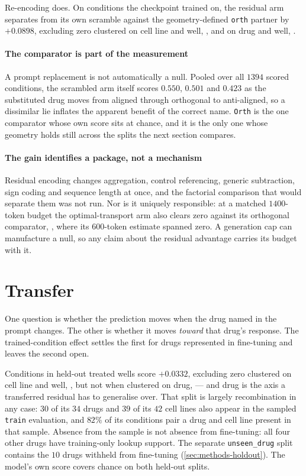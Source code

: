 Re-encoding does. On conditions the checkpoint trained on, the residual arm
separates from its own scramble against the geometry-defined \texttt{orth}
partner by $+0.0898$, excluding zero clustered on cell line and well,
, and on drug and well,
.

\paragraph{The comparator is part of the measurement} A prompt replacement is
not automatically a null. Pooled over all $\num{1394}$ scored conditions, the scrambled arm itself scores $0.550$, $0.501$ and $0.423$ as the substituted drug moves from aligned through orthogonal to
anti-aligned, so a dissimilar lie inflates the apparent benefit of the correct
name. \texttt{Orth} is the one comparator whose own score sits at chance, and it
is the only one whose geometry holds still across the splits the next section
compares.

\paragraph{The gain identifies a package, not a mechanism} Residual encoding
changes aggregation, control referencing, generic subtraction, sign coding and
sequence length at once, and the factorial comparison that would separate them
was not run. Nor is it uniquely responsible: at a matched $1400$-token budget the
optimal-transport arm also clears zero against its orthogonal comparator,
, where its $600$-token estimate spanned zero. A
generation cap can manufacture a null, so any claim about the residual advantage
carries its budget with it.

\section{Transfer}

One question is whether the prediction moves when the drug named in the prompt
changes. The other is whether it moves \emph{toward} that drug's response. The
trained-condition effect settles the first for drugs represented in fine-tuning
and leaves the second open.

Conditions in held-out treated wells score $+0.0332$, excluding zero clustered on
cell line and well, , but not when clustered on drug,
 --- and drug is the axis a transferred residual
has to generalise over. That split is largely recombination in any case: $30$
of its $34$ drugs and $39$ of its $42$ cell lines also appear in the sampled
\texttt{train} evaluation, and $82\%$ of its conditions pair a drug and cell
line present in that sample. Absence from the sample is not absence from
fine-tuning: all four other drugs have training-only lookup support. The
separate \texttt{unseen\_drug} split contains the $10$ drugs withheld from
fine-tuning (\cref{sec:methods-holdout}). The model's own
score covers chance on both held-out splits.

